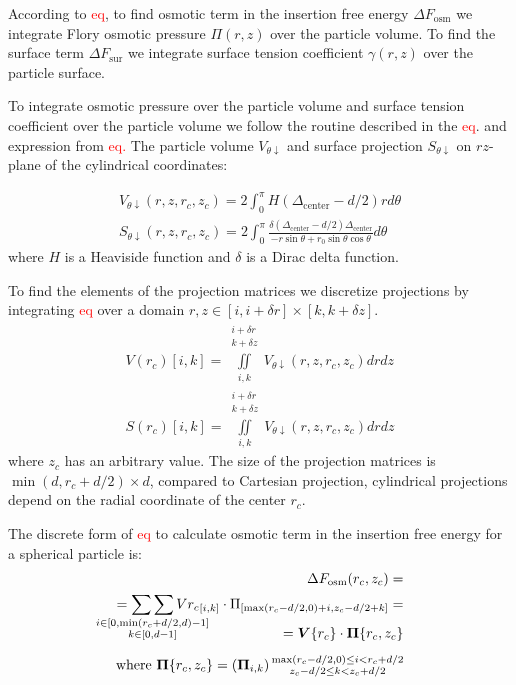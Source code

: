 \documentclass[10pt, a4paper]{article}
\newcommand\todo[1]{\textcolor{red}{#1}}
\begin{document}
\begin{multicols}{2}
According to \todo{eq}, to find osmotic term in the insertion free energy $\Delta F_{\textrm{osm}}$ we integrate Flory osmotic pressure $\Pi(r,z)$ over the particle volume.
To find the surface term $\Delta F_{\textrm{sur}}$ we integrate surface tension coefficient $\gamma(r,z)$ over the particle surface. 

To integrate osmotic pressure over the particle volume and surface tension coefficient over the particle volume we follow the routine described in the \todo{eq}. and expression from \todo{eq.}
The particle volume $V_{\theta \downarrow}$ and surface projection $S_{\theta \downarrow}$ on $rz$-plane of the cylindrical coordinates:

\begin{gather}
    V_{\theta \downarrow}(r, z, r_c, z_c) = 2\int_{0}^{\pi} H\left(\Delta_{\textrm{center}} - d/2\right) r d\theta
    \\
    S_{\theta \downarrow}(r, z, r_c, z_c) = 2\int_{0}^{\pi} \frac{\delta \left(\Delta_{\textrm{center}} - d/2\right) \Delta_{\textrm{center}}}{-r \sin \theta + r_0 \sin \theta \cos \theta} d\theta
\end{gather}
where $H$ is a Heaviside function and $\delta$ is a Dirac delta function.

To find the elements of the projection matrices we discretize projections by integrating \todo{eq} over a domain $r,z \in [i, i+\delta r] \times [k, k +\delta z]$.
\begin{eqnarray}
    V(r_c)[i, k] = \iint \limits_{i, k}^{\substack{i+\delta r\\ k+\delta z}} V_{\theta \downarrow} (r, z, r_c, z_c) dr dz
    \\
    S(r_c)[i, k] = \iint \limits_{i, k}^{\substack{i+\delta r\\ k+\delta z}} V_{\theta \downarrow} (r, z, r_c, z_c) dr dz
\end{eqnarray}
where $z_c$ has an arbitrary value. 
The size of the projection matrices is $\min(d, r_c+d/2) \times d$, compared to Cartesian projection, cylindrical projections depend on the radial coordinate of the center $r_c$.

The discrete form of \todo{eq} to calculate osmotic term in the insertion free energy for a spherical particle is:
\begin{eqnarray}
    \begin{split}
        \Delta F_{\textrm{osm}}(r_c, z_c) =\\
        = \mathop{\sum\sum}_{\mathclap{\substack{i \in [0, \min(r_c+d/2,d)-1] \\ k \in [0, d-1]}}} V{r_c}_{[i, k]} \cdot \Pi_{[\max(r_c-d/2,0)+i, z_c-d/2+k]} =\\[-15pt]
        = \bm{V}\{r_c\} \cdot \bm{\Pi}\{r_c, z_c\} \\[5pt]
        \text{where } \bm{\Pi}\{r_c,z_c\} =\left(\bm{\Pi}_{i,k}\right) {\substack{\max(r_c-d/2,0) \le i < r_c+d/2 \\ z_c-d/2 \le k < z_c+d/2}}
    \end{split}
\end{eqnarray}


\end{multicols}
\end{document}
